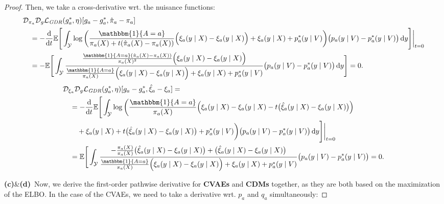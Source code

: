 \documentclass[dvipsnames]{article} %
\newcommand*\diff{\mathop{}\!\mathrm{d}}
\begin{document}
\begin{proof}
    Then, we take a cross-derivative wrt. the nuisance functions:
    \begingroup\makeatletter\def\f@size{8}\check@mathfonts
    \begin{align}
        & \mathcal{D}_{\pi_a} \mathcal{D}_g\mathcal{L}_\text{\emph{GDR}}(g_a^*, \eta)[g_a - g_a^*, \hat{\pi}_a - \pi_a] \\
        & \quad =  - \frac{\diff}{\diff t} \mathbb{E}\Bigg[ \int_{\mathcal{Y}} \log \bigg(\frac{\mathbbm{1}\{A = a\}}{\pi_a(X) + t(\hat{\pi}_a(X) - \pi_a(X))} \Big(\xi_a(y \mid X) - {\xi}_a(y \mid X) \Big) + {\xi}_a(y \mid X) +p_a^*(y \mid V) \bigg) \big({p_a(y \mid V) - p_a^*(y \mid V)}\big) \diff y \Bigg]\bigg|_{t=0} \nonumber\\
        & \quad = - \mathbb{E}\Bigg[ \int_{\mathcal{Y}} \frac{\frac{\mathbbm{1}\{A = a\}(\hat{\pi}_a(X) - \pi_a(X))}{\pi_a(X)^2} \Big(\xi_a(y \mid X) - {\xi}_a(y \mid X) \Big)}{{\frac{\mathbbm{1}\{A = a\}}{\pi_a(X)}}  \Big(\xi_a(y \mid X) - {\xi}_a(y \mid X)\Big) + {\xi}_a(y \mid X) + p_a^*(y \mid V)} \big({p_a(y \mid V) - p_a^*(y \mid V)}\big) \diff y \Bigg] = 0.
    \end{align}
    \endgroup
    \begingroup\makeatletter\def\f@size{8}\check@mathfonts
    \begin{align}
        & \mathcal{D}_{\xi_a} \mathcal{D}_g\mathcal{L}_\text{\emph{GDR}}(g_a^*, \eta)[g_a - g_a^*, \hat{\xi}_a - \xi_a]= \\
        & \quad =  - \frac{\diff}{\diff t} \mathbb{E}\Bigg[ \int_{\mathcal{Y}} \log \bigg(\frac{\mathbbm{1}\{A = a\}}{\pi_a(X)} \Big(\xi_a(y \mid X) - {\xi}_a(y \mid X) - t \big(\hat{\xi}_a(y \mid X) - {\xi}_a(y \mid X)\big) \Big) \nonumber \\
        & \quad \quad + {\xi}_a(y \mid X) + t\big(\hat{\xi}_a(y \mid X) - {\xi}_a(y \mid X)\big) +p_a^*(y \mid V) \bigg) \big({p_a(y \mid V) - p_a^*(y \mid V)}\big) \diff y \Bigg]\bigg|_{t=0} \nonumber \\
        & \quad = \mathbb{E}\Bigg[ \int_{\mathcal{Y}} \frac{- \frac{\pi_a(X)}{\pi_a(X)} \big( \hat{\xi}_a(y \mid X) - {\xi}_a(y \mid X) \big) + \big( \hat{\xi}_a(y \mid X) - {\xi}_a(y \mid X) \big)}{\frac{\mathbbm{1}\{A = a\}}{\pi_a(X)} \Big(\xi_a(y \mid X) - {\xi}_a(y \mid X) \Big) + {\xi}_a(y \mid X)+ p_a^*(y \mid V)}  \big({p_a(y \mid V) - p_a^*(y \mid V)}\big) = 0.
    \end{align}
    \endgroup

    \textbf{(c)}\&\textbf{(d)}~Now, we derive the first-order pathwise derivative for \textbf{CVAEs} and \textbf{CDMs} together, as they are both based on the maximization of the ELBO. In the case of the CVAEs, we need to take a derivative wrt. $p_a$ and $q_a$ simultaneously: 


\end{proof}
\end{document}
